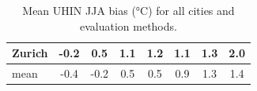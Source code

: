 \begin{table}[t]
\begin{tabular}{lccc ccc c}
Zurich & \cellcolor[RGB]{205,217,236}-0.2 & \cellcolor[RGB]{244,196,173}0.5 & \cellcolor[RGB]{242,147,117}1.1 & \cellcolor[RGB]{236,130,102}1.2 & \cellcolor[RGB]{241,142,112}1.1 & \cellcolor[RGB]{233,121,94}1.3 & \cellcolor[RGB]{181,8,39}2.0 \\
\midrule
mean & \cellcolor[RGB]{193,212,244}-0.4 & \cellcolor[RGB]{204,216,237}-0.2 & \cellcolor[RGB]{244,194,170}0.5 & \cellcolor[RGB]{244,195,171}0.5 & \cellcolor[RGB]{246,166,135}0.9 & \cellcolor[RGB]{234,123,96}1.3 & \cellcolor[RGB]{225,104,82}1.4 \\
\bottomrule
\end{tabular}
\caption{Mean UHIN JJA bias (°C) for all cities and evaluation methods.}
\label{tab:bias}
\end{table}